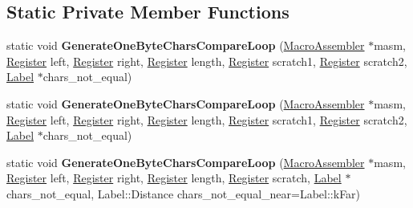\subsection*{Static Private Member Functions}
\begin{DoxyCompactItemize}
\item 
static void {\bfseries Generate\+One\+Byte\+Chars\+Compare\+Loop} (\hyperlink{classv8_1_1internal_1_1_macro_assembler}{Macro\+Assembler} $\ast$masm, \hyperlink{structv8_1_1internal_1_1_register}{Register} left, \hyperlink{structv8_1_1internal_1_1_register}{Register} right, \hyperlink{structv8_1_1internal_1_1_register}{Register} length, \hyperlink{structv8_1_1internal_1_1_register}{Register} scratch1, \hyperlink{structv8_1_1internal_1_1_register}{Register} scratch2, \hyperlink{classv8_1_1internal_1_1_label}{Label} $\ast$chars\+\_\+not\+\_\+equal)\hypertarget{classv8_1_1internal_1_1_string_helper_a1aacd9ddd9e9ff5e679ca092db0a1d0c}{}\label{classv8_1_1internal_1_1_string_helper_a1aacd9ddd9e9ff5e679ca092db0a1d0c}

\item 
static void {\bfseries Generate\+One\+Byte\+Chars\+Compare\+Loop} (\hyperlink{classv8_1_1internal_1_1_macro_assembler}{Macro\+Assembler} $\ast$masm, \hyperlink{structv8_1_1internal_1_1_register}{Register} left, \hyperlink{structv8_1_1internal_1_1_register}{Register} right, \hyperlink{structv8_1_1internal_1_1_register}{Register} length, \hyperlink{structv8_1_1internal_1_1_register}{Register} scratch1, \hyperlink{structv8_1_1internal_1_1_register}{Register} scratch2, \hyperlink{classv8_1_1internal_1_1_label}{Label} $\ast$chars\+\_\+not\+\_\+equal)\hypertarget{classv8_1_1internal_1_1_string_helper_a1aacd9ddd9e9ff5e679ca092db0a1d0c}{}\label{classv8_1_1internal_1_1_string_helper_a1aacd9ddd9e9ff5e679ca092db0a1d0c}

\item 
static void {\bfseries Generate\+One\+Byte\+Chars\+Compare\+Loop} (\hyperlink{classv8_1_1internal_1_1_macro_assembler}{Macro\+Assembler} $\ast$masm, \hyperlink{structv8_1_1internal_1_1_register}{Register} left, \hyperlink{structv8_1_1internal_1_1_register}{Register} right, \hyperlink{structv8_1_1internal_1_1_register}{Register} length, \hyperlink{structv8_1_1internal_1_1_register}{Register} scratch, \hyperlink{classv8_1_1internal_1_1_label}{Label} $\ast$chars\+\_\+not\+\_\+equal, Label\+::\+Distance chars\+\_\+not\+\_\+equal\+\_\+near=Label\+::k\+Far)\hypertarget{classv8_1_1internal_1_1_string_helper_ab8aaed6a4ad5582bc330b0f8662e7def}{}\label{classv8_1_1internal_1_1_string_helper_ab8aaed6a4ad5582bc330b0f8662e7def}


\end{DoxyCompactItemize}
